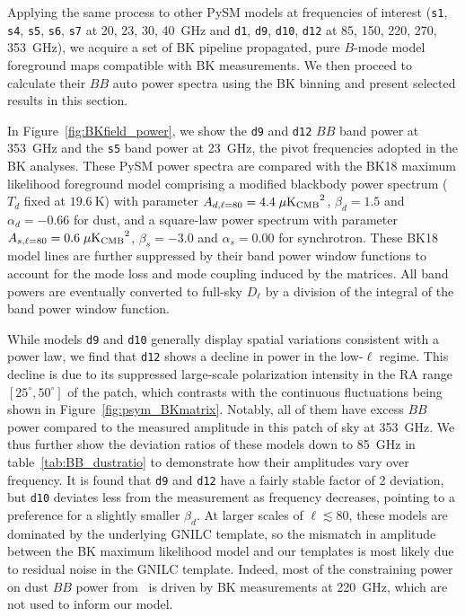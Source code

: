 \documentclass[twocolumn]{aastex631}
\begin{document}
Applying the same process to other PySM models at frequencies of interest (\texttt{s1}, \texttt{s4}, \texttt{s5}, \texttt{s6}, \texttt{s7} at 20, 23, 30, 40~GHz and \texttt{d1}, \texttt{d9}, \texttt{d10}, \texttt{d12} at 85, 150, 220, 270, 353~GHz), we acquire a set of BK pipeline propagated, pure $B$-mode model foreground maps compatible with BK measurements. We then proceed to calculate their $BB$ auto power spectra using the BK binning and present selected results in this section. 

In Figure~\ref{fig:BKfield_power}, we show the \texttt{d9} and \texttt{d12} $BB$ band power at 353~GHz and the \texttt{s5} band power at 23~GHz, the pivot frequencies adopted in the BK analyses. These PySM power spectra are compared with the BK18 maximum likelihood foreground model comprising a modified blackbody power spectrum ($T_d$ fixed at $19.6~\text{K}$) with parameter $A_{d,\ell=80} = 4.4 \; \mu\rm{K_{CMB}}^2$, $\beta_d = 1.5$ and $\alpha_d = -0.66$ for dust, and a square-law power spectrum with parameter $A_{s,\ell=80} = 0.6 \; \mu\rm{K_{CMB}}^2$, $\beta_s = -3.0$ and $\alpha_s = 0.00$ for synchrotron. These BK18 model lines are further suppressed by their band power window functions to account for the mode loss and mode coupling induced by the matrices. All band powers are eventually converted to full-sky $D_\ell$ by a division of the integral of the band power window function.

While models \texttt{d9} and \texttt{d10} generally display spatial variations consistent with a power law, we find that \texttt{d12} shows a decline in power in the low-$\ell$ regime. This decline is due to its suppressed large-scale polarization intensity in the RA range $[25^{\circ}, 50^{\circ}]$ of the patch, which contrasts with the continuous fluctuations being shown in Figure~\ref{fig:psym_BKmatrix}. Notably, all of them have excess $BB$ power compared to the measured amplitude in this patch of sky at 353~GHz. We thus further show the deviation ratios of these models down to 85~GHz in table~\ref{tab:BB_dustratio} to demonstrate how their amplitudes vary over frequency. It is found that \texttt{d9} and \texttt{d12} have a fairly stable factor of 2 deviation, but \texttt{d10} deviates less from the measurement as frequency decreases, pointing to a preference for a slightly smaller $\beta_d$. At larger scales of $\ell \lesssim 80$, these models are dominated by the underlying GNILC template, so the mismatch in amplitude between the BK maximum likelihood model and our templates is most likely due to residual noise in the GNILC template. Indeed, most of the constraining power on dust $BB$ power from~\cite{Ade:2021} is driven by BK measurements at 220~GHz, which are not used to inform our model.
\end{document}
